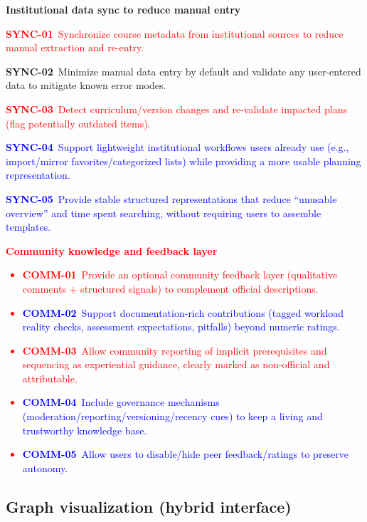 \textbf{Institutional data sync to reduce manual entry}
\begin{itemize}
  \textcolor{red}{\item \textbf{SYNC-01}~Synchronize course metadata from institutional sources to reduce manual extraction and re-entry.}
  \item \textbf{SYNC-02}~Minimize manual data entry by default and validate any user-entered data to mitigate known error modes.
  \item \textcolor{red}{\textbf{SYNC-03}~Detect curriculum/version changes and re-validate impacted plans (flag potentially outdated items).}
  \item \textcolor{blue}{\textbf{SYNC-04}~Support lightweight institutional workflows users already use (e.g., import/mirror favorites/categorized lists) while providing a more usable planning representation.}
  \item \textcolor{blue}{\textbf{SYNC-05}~Provide stable structured representations that reduce “unusable overview” and time spent searching, without requiring users to assemble templates.}
\end{itemize}

\textcolor{red}{\textbf{Community knowledge and feedback layer}
\begin{itemize}
  \item \textbf{COMM-01}~Provide an optional community feedback layer (qualitative comments + structured signals) to complement official descriptions.
  \item \textcolor{blue}{\textbf{COMM-02}~Support documentation-rich contributions (tagged workload reality checks, assessment expectations, pitfalls) beyond numeric ratings.}
  \item \textbf{COMM-03}~Allow community reporting of implicit prerequisites and sequencing as experiential guidance, clearly marked as non-official and attributable.
  \item \textcolor{blue}{\textbf{COMM-04}~Include governance mechanisms (moderation/reporting/versioning/recency cues) to keep a living and trustworthy knowledge base.}
  \item \textcolor{blue}{\textbf{COMM-05}~Allow users to disable/hide peer feedback/ratings to preserve autonomy.}
\end{itemize}}


\subsection*{Graph visualization (hybrid interface)}

